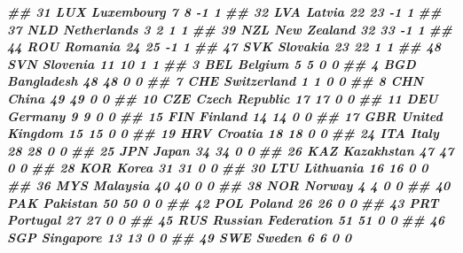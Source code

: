 \documentclass[
]{book}
\newenvironment{Shaded}{\begin{snugshade}}{\end{snugshade}}
\newcommand{\DocumentationTok}[1]{\textcolor[rgb]{0.56,0.35,0.01}{\textbf{\textit{#1}}}}
\begin{document}
\begin{Shaded}
\begin{Highlighting}[]
\DocumentationTok{\#\# 31      LUX         Luxembourg         7         8         {-}1             1}
\DocumentationTok{\#\# 32      LVA             Latvia        22        23         {-}1             1}
\DocumentationTok{\#\# 37      NLD        Netherlands         3         2          1             1}
\DocumentationTok{\#\# 39      NZL        New Zealand        32        33         {-}1             1}
\DocumentationTok{\#\# 44      ROU            Romania        24        25         {-}1             1}
\DocumentationTok{\#\# 47      SVK           Slovakia        23        22          1             1}
\DocumentationTok{\#\# 48      SVN           Slovenia        11        10          1             1}
\DocumentationTok{\#\# 3       BEL            Belgium         5         5          0             0}
\DocumentationTok{\#\# 4       BGD         Bangladesh        48        48          0             0}
\DocumentationTok{\#\# 7       CHE        Switzerland         1         1          0             0}
\DocumentationTok{\#\# 8       CHN              China        49        49          0             0}
\DocumentationTok{\#\# 10      CZE     Czech Republic        17        17          0             0}
\DocumentationTok{\#\# 11      DEU            Germany         9         9          0             0}
\DocumentationTok{\#\# 15      FIN            Finland        14        14          0             0}
\DocumentationTok{\#\# 17      GBR     United Kingdom        15        15          0             0}
\DocumentationTok{\#\# 19      HRV            Croatia        18        18          0             0}
\DocumentationTok{\#\# 24      ITA              Italy        28        28          0             0}
\DocumentationTok{\#\# 25      JPN              Japan        34        34          0             0}
\DocumentationTok{\#\# 26      KAZ         Kazakhstan        47        47          0             0}
\DocumentationTok{\#\# 28      KOR              Korea        31        31          0             0}
\DocumentationTok{\#\# 30      LTU          Lithuania        16        16          0             0}
\DocumentationTok{\#\# 36      MYS           Malaysia        40        40          0             0}
\DocumentationTok{\#\# 38      NOR             Norway         4         4          0             0}
\DocumentationTok{\#\# 40      PAK           Pakistan        50        50          0             0}
\DocumentationTok{\#\# 42      POL             Poland        26        26          0             0}
\DocumentationTok{\#\# 43      PRT           Portugal        27        27          0             0}
\DocumentationTok{\#\# 45      RUS Russian Federation        51        51          0             0}
\DocumentationTok{\#\# 46      SGP          Singapore        13        13          0             0}
\DocumentationTok{\#\# 49      SWE             Sweden         6         6          0             0}
\end{Highlighting}
\end{Shaded}
\end{document}
